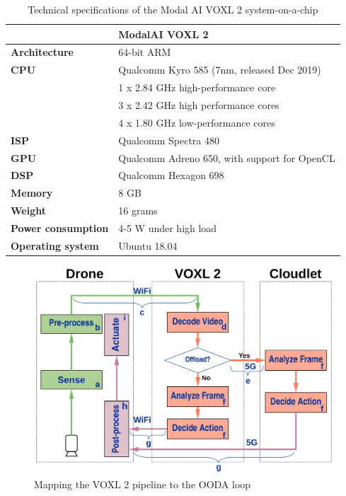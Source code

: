 \begin{table}[htbp]
    \centering
    \begin{tabular}{@{}ll@{}}
        \toprule
        \textbf{} & \textbf{ModalAI VOXL 2}\\
        \midrule
        \textbf{Architecture} & 64-bit ARM\\
        \textbf{CPU} & Qualcomm Kyro 585 (7nm, released Dec 2019)\\
                     & 1 x 2.84 GHz high-performance core\\
                     & 3 x 2.42 GHz high performance cores\\
                     & 4 x 1.80 GHz low-performance cores\\
        \textbf{ISP} & Qualcomm Spectra 480\\
        \textbf{GPU} & Qualcomm Adreno 650, with support for OpenCL\\
        \textbf{DSP} & Qualcomm Hexagon 698\\
        \textbf{Memory} & 8 GB\\
        \textbf{Weight} & 16 grams\\
        \textbf{Power consumption} & 4-5 W under high load\\
        \textbf{Operating system} & Ubuntu 18.04\\
        \bottomrule
    \end{tabular}
    \caption{Technical specifications of the Modal AI VOXL 2 system-on-a-chip}
    \label{tab:voxl2-specs}
\end{table}

\begin{figure}[htbp]
\centering
\includegraphics[width = .7\textwidth]{figs/fig-voxl-ooda-loop-crop.pdf}
\caption{Mapping the VOXL 2 pipeline to the OODA loop}
\label{fig:voxl2-ooda-loop-mapping}
\end{figure}

